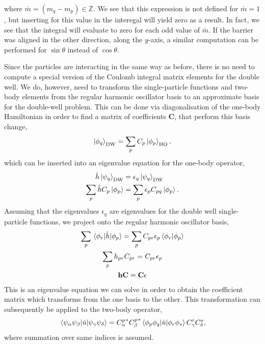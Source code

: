 where $\bar{m} = (m_q - m_p) \in \mathbb{Z}$. We see that this expression is 
not defined for $\bar{m} = 1$, but inserting for this value in the interegal 
will yield zero as a result. In fact, we see that the integral will evaluate to zero for 
each odd value of $\bar{m}$. If the barrier was aligned in the other direction,
along the $y$-axis, a similar computation can be performed for $\sin\theta$ instead of 
$\cos\theta$.

Since the particles are interacting in the same way as before, there is no need 
to compute a special version of the Coulomb integral matrix elements for the 
double well. We do, however, need to transform the single-particle functions and 
two-body elements from the regular harmonic oscillator basis to an approximate basis 
for the double-well problem. This can be done via diagonalisation of the one-body 
Hamiltonian in order to find a matrix of coefficients $\mathbf{C}$, that perform 
this basis change,
\begin{equation}
    \ket{\phi_q}_\text{DW} = \sum_p C_p \ket{\phi_p}_\text{HO},
\end{equation}
which can be inserted into an eigenvalue equation for the one-body operator,
\begin{equation}
    \begin{aligned}
        \hat{h} \ket{\psi_q}_\text{DW} &= \epsilon_q\ket{\psi_q}_\text{DW} \\
        \sum_p \hat{h}C_p \ket{\phi_p} &= \sum_p\epsilon_p C_{pq}\ket{\phi_p}.
    \end{aligned}
\end{equation}
Assuming that the eigenvalues $\epsilon_q$ are eigenvalues for the double well 
single-particle functions, we project onto the regular harmonic oscillator 
basis,
\begin{equation}
    \begin{gathered}
     \sum_p\mel{\phi_r}{\hat{h}}{\phi_p} 
        = \sum_p C_{pr} \epsilon_p \braket{\phi_r}{\phi_p} \\
    \sum_p h_{pr} C_{pr} = C_{pr}\epsilon_p \\
    \mathbf{h} \mathbf{C} = \mathbf{C} \mathbf{\epsilon}
    \end{gathered}
\end{equation}
This is an eigenvalue equation we can solve in order to obtain the coefficient 
matrix which transforms from the one basis to the other. This transformation
can subsequently be applied to the two-body operator,
\begin{equation}
    \mel{\psi_\alpha\psi_\beta}{\hat{u}}{\psi_\gamma\psi_\delta} 
    = {C^p_\alpha}^* {C^p_\beta}^* \mel{\phi_p\phi_q}{\hat{u}}{\phi_r\phi_s} C^r_\gamma C^s_\delta,
\end{equation}
where summation over same indices is assumed.

